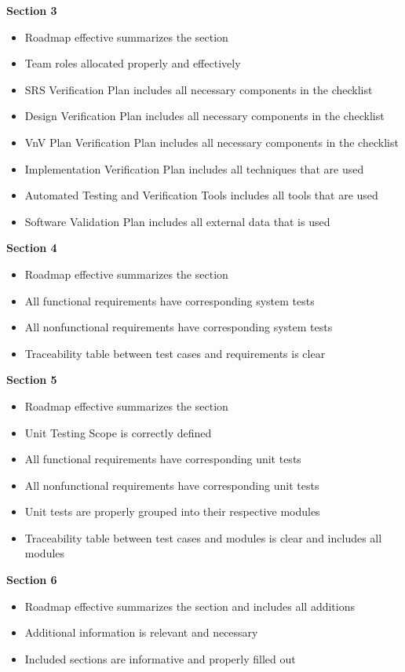 \documentclass[12pt, titlepage]{article}
\begin{document}
\noindent
\textbf{Section 3}
\begin{itemize}
  \item Roadmap effective summarizes the section
  \item Team roles allocated properly and effectively
  \item SRS Verification Plan includes all necessary components in the checklist
  \item Design Verification Plan includes all necessary components in the checklist
  \item VnV Plan Verification Plan includes all necessary components in the checklist
  \item Implementation Verification Plan includes all techniques that are used
  \item Automated Testing and Verification Tools includes all tools that are used
  \item Software Validation Plan includes all external data that is used
\end{itemize}
\noindent
\textbf{Section 4}
\begin{itemize}
  \item Roadmap effective summarizes the section
  \item All functional requirements have corresponding system tests
  \item All nonfunctional requirements have corresponding system tests
  \item Traceability table between test cases and requirements is clear
\end{itemize}
\noindent
\textbf{Section 5}
\begin{itemize}
  \item Roadmap effective summarizes the section
  \item Unit Testing Scope is correctly defined
  \item All functional requirements have corresponding unit tests
  \item All nonfunctional requirements have corresponding unit tests
  \item Unit tests are properly grouped into their respective modules
  \item Traceability table between test cases and modules is clear and includes all modules
\end{itemize}
\noindent
\textbf{Section 6}
\begin{itemize}
  \item Roadmap effective summarizes the section and includes all additions
  \item Additional information is relevant and necessary
  \item Included sections are informative and properly filled out
\end{itemize}
\end{document}
